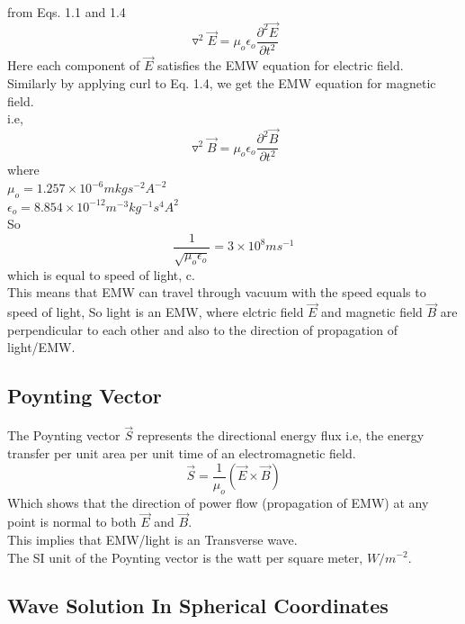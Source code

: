 \documentclass[a4paper, twoside] {thesis}
\begin{document}
from Eqs. 1.1 and 1.4\\
\begin{equation}
\triangledown^2\vec{E} =  \mu_{o}\epsilon_{o}\frac{\partial^2\vec{E}}{\partial t^2}
\end{equation}
Here each component of $\vec{E}$ satisfies the EMW equation for electric field.\\ 
Similarly by applying curl to Eq. 1.4, we get the EMW equation for magnetic field.\\
i.e,\\
\begin{equation}
\triangledown^2\vec{B} =  \mu_{o}\epsilon_{o}\frac{\partial^2\vec{B}}{\partial t^2}
\end{equation}
where \\
$\mu_{o} = 1.257\times10^{-6} mkgs^{-2}A^{-2}$\\
$\epsilon_{o} = 8.854\times10^{-12} m^{-3}kg^{-1}s^4A^2$\\
So\\
\begin{equation}
\frac{1}{\sqrt{\mu_{o}\epsilon_{o}}} = 3\times10^8 ms^{-1}
\end{equation}
which is equal to speed of light, c.\\
This means that EMW can travel through vacuum with the speed equals to speed of light, So light is an EMW, where elctric field $\vec{E}$ and magnetic field $\vec{B}$ are perpendicular to each other and also to the direction of propagation of light/EMW.

\subsection{Poynting Vector}
The Poynting vector $\vec{S}$ represents the directional energy flux i.e, the energy transfer per unit area per unit time of an electromagnetic field.\\
\begin{equation}
\vec{S} = \frac{1}{\mu_{o}}(\vec{E}\times\vec{B})
\end{equation}
Which shows that the direction of power flow (propagation of EMW) at any point is normal to both $\vec{E}$ and $\vec{B}$.\\
This implies that EMW/light is an Transverse wave.\\
The SI unit of the Poynting vector is the watt per square meter, $W/m^{-2}$.

\subsection{Wave Solution In Spherical Coordinates}
\end{document}
